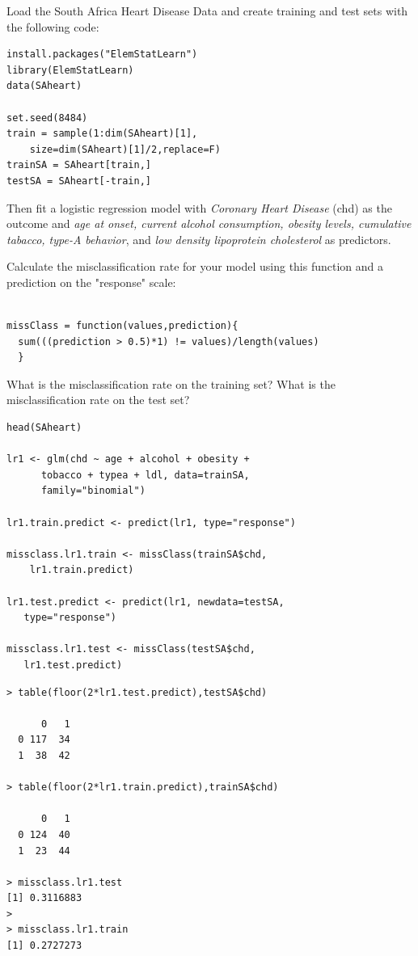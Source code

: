 \documentclass[caret-main.tex]{subfiles}
\begin{document}
Load the South Africa Heart Disease Data and create training and test sets with
the following code:
\begin{framed}
\begin{verbatim}
install.packages("ElemStatLearn")
library(ElemStatLearn)
data(SAheart)

set.seed(8484)
train = sample(1:dim(SAheart)[1],
    size=dim(SAheart)[1]/2,replace=F)
trainSA = SAheart[train,]
testSA = SAheart[-train,]

\end{verbatim}
\end{framed}

\noindent Then fit a logistic regression model with \textit{Coronary Heart Disease} (chd) as the
outcome and \textit{age at onset, current alcohol consumption, obesity levels,
cumulative tabacco, type-A behavior}, and \textit{low density lipoprotein cholesterol} as predictors. 



\noindent Calculate the misclassification rate for your model using this
function and a prediction on the "response" scale:
\begin{framed}
\begin{verbatim}

missClass = function(values,prediction){
  sum(((prediction > 0.5)*1) != values)/length(values)
  }
\end{verbatim}
\end{framed}
\noindent What is the misclassification rate on the training set? What is the
misclassification rate on the test set?
\begin{framed}
\begin{verbatim}
head(SAheart)

lr1 <- glm(chd ~ age + alcohol + obesity + 
      tobacco + typea + ldl, data=trainSA, 
      family="binomial")

lr1.train.predict <- predict(lr1, type="response")

missclass.lr1.train <- missClass(trainSA$chd, 
    lr1.train.predict)

lr1.test.predict <- predict(lr1, newdata=testSA, 
   type="response")
   
missclass.lr1.test <- missClass(testSA$chd, 
   lr1.test.predict)
\end{verbatim}
\end{framed}


\begin{verbatim}
> table(floor(2*lr1.test.predict),testSA$chd)
   
      0   1
  0 117  34
  1  38  42

> table(floor(2*lr1.train.predict),trainSA$chd)
   
      0   1
  0 124  40
  1  23  44

> missclass.lr1.test
[1] 0.3116883
> 
> missclass.lr1.train
[1] 0.2727273
\end{verbatim}
\newpage
\end{document}
